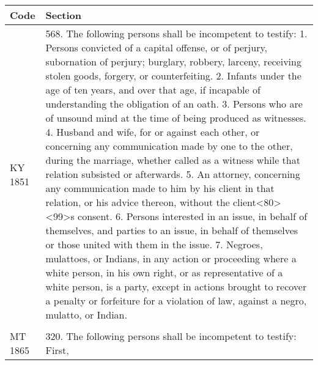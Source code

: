 \documentclass[12pt,]{article}
\begin{document}
\begin{longtable}[]{@{}ll@{}}
\toprule
\begin{minipage}[b]{0.20\columnwidth}\raggedright
Code\strut
\end{minipage} & \begin{minipage}[b]{0.74\columnwidth}\raggedright
Section\strut
\end{minipage}\tabularnewline
\midrule
\endhead
\begin{minipage}[t]{0.20\columnwidth}\raggedright
KY 1851\strut
\end{minipage} & \begin{minipage}[t]{0.74\columnwidth}\raggedright
568. The following persons shall be incompetent to testify: 1. Persons
convicted of a capital offense, or of perjury, subornation of perjury;
burglary, robbery, larceny, receiving stolen goods, forgery, or
counterfeiting. 2. Infants under the age of ten years, and over that
age, if incapable of understanding the obligation of an oath. 3. Persons
who are of unsound mind at the time of being produced as witnesses. 4.
Husband and wife, for or against each other, or concerning any
communication made by one to the other, during the marriage, whether
called as a witness while that relation subsisted or afterwards. 5. An
attorney, concerning any communication made to him by his client in that
relation, or his advice thereon, without the
client\textless80\textgreater\textless99\textgreater s consent. 6.
Persons interested in an issue, in behalf of themselves, and parties to
an issue, in behalf of themselves or those united with them in the
issue. 7. Negroes, mulattoes, or Indians, in any action or proceeding
where a white person, in his own right, or as representative of a white
person, is a party, except in actions brought to recover a penalty or
forfeiture for a violation of law, against a negro, mulatto, or
Indian.\strut
\end{minipage}\tabularnewline
\begin{minipage}[t]{0.20\columnwidth}\raggedright
\strut
\end{minipage} & \begin{minipage}[t]{0.74\columnwidth}\raggedright
\strut
\end{minipage}\tabularnewline
\begin{minipage}[t]{0.20\columnwidth}\raggedright
MT 1865\strut
\end{minipage} & \begin{minipage}[t]{0.74\columnwidth}\raggedright
320. The following persons shall be incompetent to testify: First,

\end{minipage}
\end{longtable}
\end{document}
